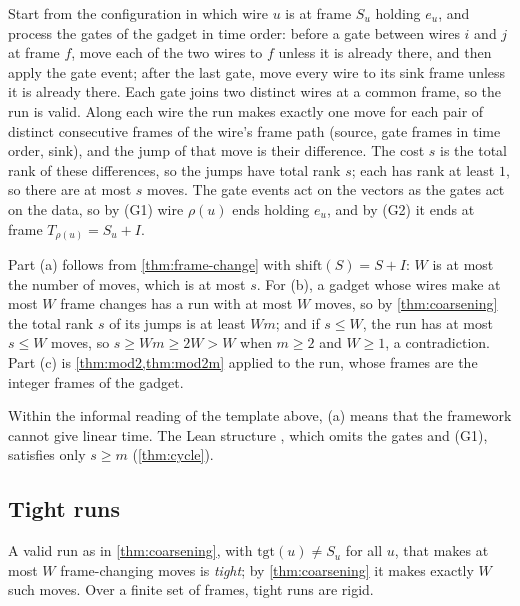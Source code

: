 \begin{informalproof}
Start from the configuration in which wire $u$ is at frame $S_u$ holding $e_u$, and process the gates of the
gadget in time order: before a gate between wires $i$ and $j$ at frame $f$, move each of the two wires to $f$
unless it is already there, and then apply the gate event; after the last gate, move every wire to its sink
frame unless it is already there. Each gate joins two distinct wires at a common frame, so the run is valid.
Along each wire the run makes exactly one move for each pair of distinct consecutive frames of the wire's frame
path (source, gate frames in time order, sink), and the jump of that move is their difference. The cost $s$ is
the total rank of these differences, so the jumps have total rank $s$; each has rank at least $1$, so there are
at most $s$ moves. The gate events act on the vectors as the gates act on the data, so by (G1) wire $\rho(u)$
ends holding $e_u$, and by (G2) it ends at frame $T_{\rho(u)}=S_u+I$.

Part (a) follows from \cref{thm:frame-change} with $\mathrm{shift}(S)=S+I$: $W$ is at most the number of moves,
which is at most $s$. For (b), a gadget whose wires make at most $W$ frame changes has a run with at most $W$
moves, so by \cref{thm:coarsening} the total rank $s$ of its jumps is at least $Wm$; and if $s\le W$, the run has
at most $s\le W$ moves, so $s\ge Wm\ge2W>W$ when $m\ge2$ and $W\ge1$, a contradiction. Part (c) is
\cref{thm:mod2,thm:mod2m} applied to the run, whose frames are the integer frames of the gadget.
\end{informalproof}

Within the informal reading of the template above, (a) means that the framework cannot give linear time. The
Lean structure , which omits the gates and (G1), satisfies only $s\ge m$
(\cref{thm:cycle}).

\subsection{Tight runs}

A valid run as in \cref{thm:coarsening}, with $\mathrm{tgt}(u)\ne S_u$ for all $u$, that makes at most $W$ frame-changing moves is \emph{tight}; by \cref{thm:coarsening} it makes exactly $W$ such moves.
Over a finite set of frames, tight runs are rigid.

